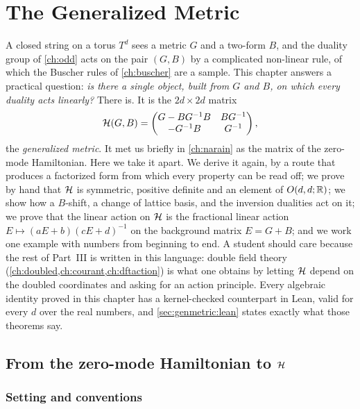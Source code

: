 \chapter{The Generalized Metric}\label{ch:genmetric}

A closed string on a torus $T^d$ sees a metric $G$ and a two-form $B$, and the duality group
of \cref{ch:odd} acts on the pair $(G,B)$ by a complicated non-linear rule, of which the
Buscher rules of \cref{ch:buscher} are a sample. This chapter answers a practical question:
\emph{is there a single object, built from $G$ and $B$, on which every duality acts
linearly?} There is. It is the $2d\times 2d$ matrix
\[
 \mathcal{H}(G,B)=\begin{pmatrix}G-BG^{-1}B&BG^{-1}\\-G^{-1}B&G^{-1}\end{pmatrix},
\]
the \emph{generalized metric}. It met us briefly in \cref{ch:narain} as the matrix of the
zero-mode Hamiltonian. Here we take it apart. We derive it again, by a route that produces a
factorized form from which every property can be read off; we prove by hand that $\mathcal{H}$ is
symmetric, positive definite and an element of $O(d,d;\mathbb{R})$; we show how a $B$-shift, a change
of lattice basis, and the inversion dualities act on it; we prove that the linear action on
$\mathcal{H}$ is the fractional linear action $E\mapsto(aE+b)(cE+d)^{-1}$ on the background matrix
$E=G+B$; and we work one example with numbers from beginning to end. A student should care
because the rest of Part~III is written in this language: double field theory
(\cref{ch:doubled,ch:courant,ch:dftaction}) is what one obtains by letting $\mathcal{H}$ depend on the
doubled coordinates and asking for an action principle. Every algebraic identity proved in
this chapter has a kernel-checked counterpart in Lean, valid for every $d$ over the real
numbers, and \cref{sec:genmetric:lean} states exactly what those theorems say.

\section{From the zero-mode Hamiltonian to \texorpdfstring{$\mathcal{H}$}{H}}
\label{sec:genmetric:construction}

\subsection{Setting and conventions}

